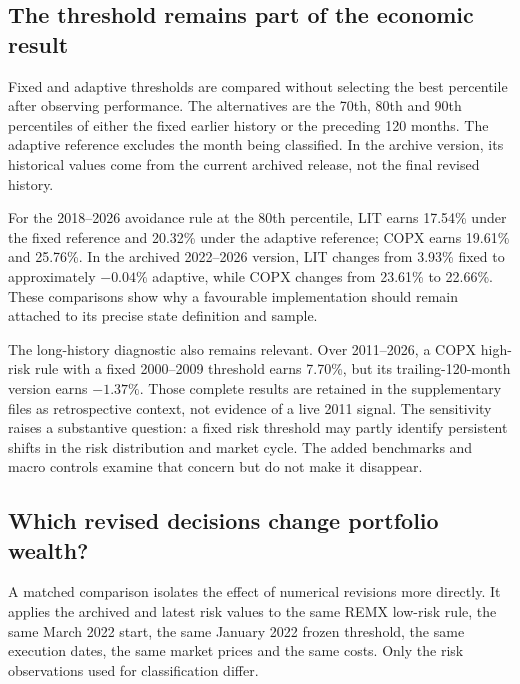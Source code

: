 \subsection{The threshold remains part of the economic result}

Fixed and adaptive thresholds are compared without selecting the best percentile after observing performance. The alternatives are the 70th, 80th and 90th percentiles of either the fixed earlier history or the preceding 120 months. The adaptive reference excludes the month being classified. In the archive version, its historical values come from the current archived release, not the final revised history.

For the 2018–2026 avoidance rule at the 80th percentile, LIT earns 17.54\% under the fixed reference and 20.32\% under the adaptive reference; COPX earns 19.61\% and 25.76\%. In the archived 2022–2026 version, LIT changes from 3.93\% fixed to approximately $-0.04\%$ adaptive, while COPX changes from 23.61\% to 22.66\%. These comparisons show why a favourable implementation should remain attached to its precise state definition and sample.


The long-history diagnostic also remains relevant. Over 2011–2026, a COPX high-risk rule with a fixed 2000–2009 threshold earns 7.70\%, but its trailing-120-month version earns $-1.37\%$. Those complete results are retained in the supplementary files as retrospective context, not evidence of a live 2011 signal. The sensitivity raises a substantive question: a fixed risk threshold may partly identify persistent shifts in the risk distribution and market cycle. The added benchmarks and macro controls examine that concern but do not make it disappear.

\subsection{Which revised decisions change portfolio wealth?}

A matched comparison isolates the effect of numerical revisions more directly. It applies the archived and latest risk values to the same REMX low-risk rule, the same March 2022 start, the same January 2022 frozen threshold, the same execution dates, the same market prices and the same costs. Only the risk observations used for classification differ.

